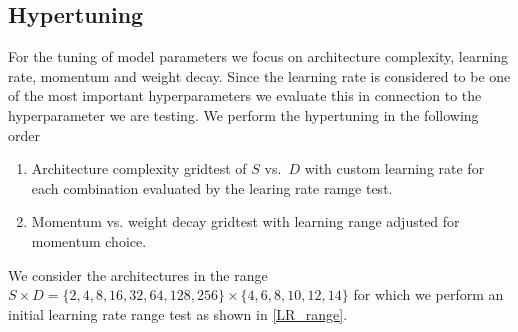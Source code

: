 \subsection{Hypertuning}
For the tuning of model parameters we focus on architecture complexity, learning rate, momentum and weight decay. Since the learning rate is considered to be one of the most important hyperparameters we evaluate this in connection to the hyperparameter we are testing. We perform the hypertuning in the following order
\begin{enumerate}
  \item Architecture complexity gridtest of $S$ vs.\ $D$ with custom learning rate for each combination evaluated by the learing rate ramge test.
  \item Momentum vs. weight decay gridtest with learning range adjusted for momentum choice. 
\end{enumerate}


We consider the architectures in the range $S \times D = \{2,4,8,16,32,64,128,256\} \times \{4,6,8,10,12,14\}$ for which we perform an initial learning rate range test as shown in \cref{LR_range}.

